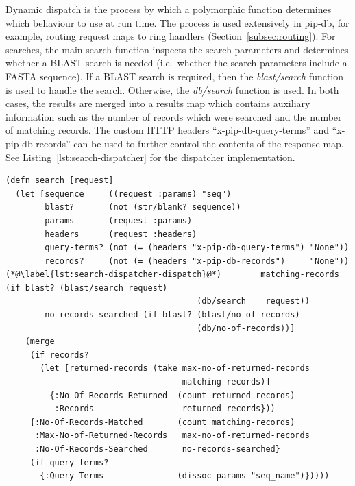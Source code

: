 Dynamic dispatch is the process by which a polymorphic function
determines which behaviour to use at run time. The process is used
extensively in pip-db, for example, routing request maps to ring
handlers (Section~\ref{subsec:routing}). For searches, the main search
function inspects the search parameters and determines whether a BLAST
search is needed (i.e.\ whether the search parameters include a FASTA
sequence). If a BLAST search is required, then the
\textit{blast/search} function is used to handle the
search. Otherwise, the \textit{db/search} function is used. In both
cases, the results are merged into a results map which contains
auxiliary information such as the number of records which were
searched and the number of matching records. The custom HTTP headers
``x-pip-db-query-terms'' and ``x-pip-db-records'' can be used to
further control the contents of the response map. See
Listing~\ref{lst:search-dispatcher} for the dispatcher implementation.

\newpage

\lstset{language=clojure}
\begin{lstlisting}[label=lst:search-dispatcher,caption={%
      [Search handler and dynamic dispatcher]
      Search handler and dynamic dispatcher. Accepting a request map,
      the search handler dispatches the appropriate search function
      (line \ref{lst:search-dispatcher-dispatch}), wrapping the
      results into a response map.}]
(defn search [request]
  (let [sequence     ((request :params) "seq")
        blast?       (not (str/blank? sequence))
        params       (request :params)
        headers      (request :headers)
        query-terms? (not (= (headers "x-pip-db-query-terms") "None"))
        records?     (not (= (headers "x-pip-db-records")     "None"))
(*@\label{lst:search-dispatcher-dispatch}@*)        matching-records    (if blast? (blast/search request)
                                       (db/search    request))
        no-records-searched (if blast? (blast/no-of-records)
                                       (db/no-of-records))]
    (merge
     (if records?
       (let [returned-records (take max-no-of-returned-records
                                    matching-records)]
         {:No-Of-Records-Returned  (count returned-records)
          :Records                  returned-records}))
     {:No-Of-Records-Matched       (count matching-records)
      :Max-No-of-Returned-Records   max-no-of-returned-records
      :No-Of-Records-Searched       no-records-searched}
     (if query-terms?
       {:Query-Terms               (dissoc params "seq_name")}))))
\end{lstlisting}


